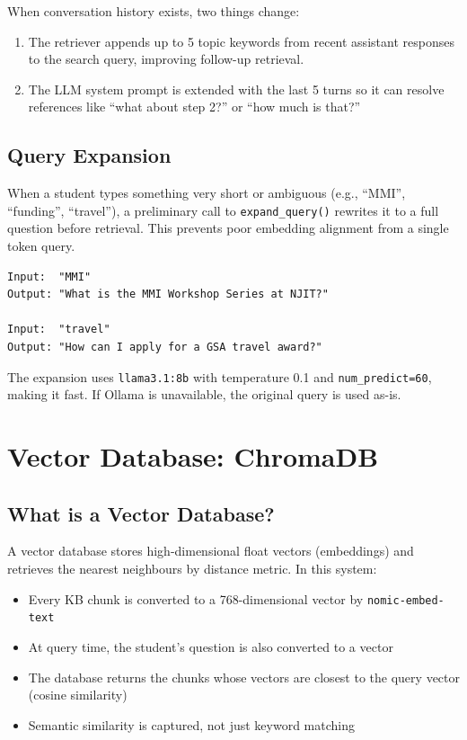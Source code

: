 \documentclass[12pt,letterpaper]{article}
\begin{document}
When conversation history exists, two things change:
\begin{enumerate}[leftmargin=2em]
  \item The retriever appends up to 5 topic keywords from recent assistant
        responses to the search query, improving follow-up retrieval.
  \item The LLM system prompt is extended with the last 5 turns so it can
        resolve references like ``what about step 2?'' or ``how much is that?''
\end{enumerate}

\subsection{Query Expansion}

When a student types something very short or ambiguous (e.g., ``MMI'',
``funding'', ``travel''), a preliminary call to \texttt{expand\_query()} rewrites
it to a full question before retrieval. This prevents poor embedding alignment
from a single token query.

\begin{lstlisting}[numbers=none]
Input:  "MMI"
Output: "What is the MMI Workshop Series at NJIT?"

Input:  "travel"
Output: "How can I apply for a GSA travel award?"
\end{lstlisting}

The expansion uses \texttt{llama3.1:8b} with temperature 0.1 and \texttt{num\_predict=60},
making it fast. If Ollama is unavailable, the original query is used as-is.

\section{Vector Database: ChromaDB}

\subsection{What is a Vector Database?}

A vector database stores high-dimensional float vectors (embeddings) and
retrieves the nearest neighbours by distance metric. In this system:

\begin{itemize}[leftmargin=2em]
  \item Every KB chunk is converted to a 768-dimensional vector by
        \texttt{nomic-embed-text}
  \item At query time, the student's question is also converted to a vector
  \item The database returns the chunks whose vectors are closest to the query
        vector (cosine similarity)
  \item Semantic similarity is captured, not just keyword matching
\end{itemize}
\end{document}
